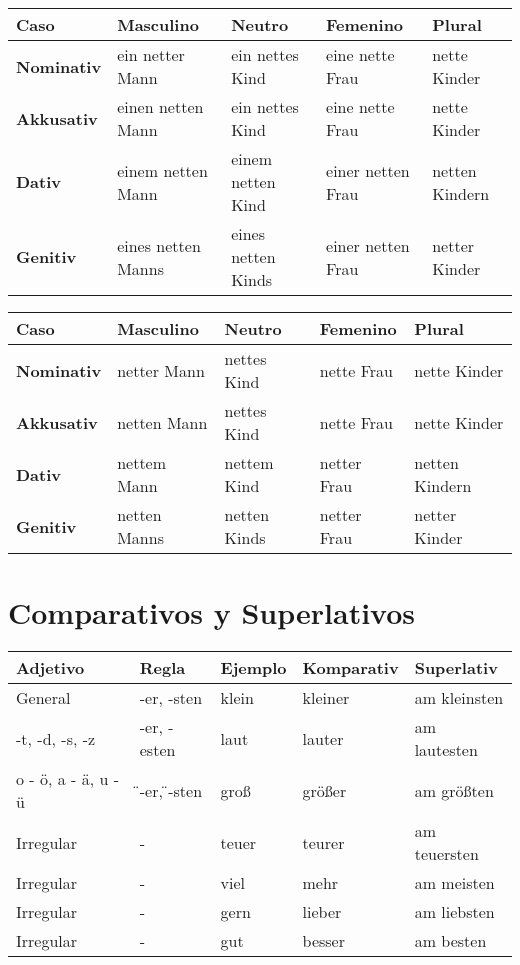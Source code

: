 \begin{tabular}{| l | l | l | l | l |}
\hline
\textbf{Caso} & \textbf{Masculino} & \textbf{Neutro} & \textbf{Femenino} & \textbf{Plural} \\
\hline
\textbf{Nominativ} & ein netter Mann & ein nettes Kind & eine nette Frau &  nette Kinder \\
\textbf{Akkusativ} & einen netten Mann & ein nettes Kind & eine nette Frau & nette Kinder \\
\textbf{Dativ} & einem netten Mann & einem netten Kind & einer netten Frau & netten Kindern \\
\textbf{Genitiv} & eines netten Manns & eines netten Kinds & einer netten Frau & netter Kinder \\
\hline
\end{tabular}



\begin{tabular}{| l | l | l | l | l |}
\hline
\textbf{Caso} & \textbf{Masculino} & \textbf{Neutro} & \textbf{Femenino} & \textbf{Plural} \\
\hline
\textbf{Nominativ} & netter Mann & nettes Kind & nette Frau &  nette Kinder \\
\textbf{Akkusativ} & netten Mann & nettes Kind & nette Frau & nette Kinder \\
\textbf{Dativ} & nettem Mann & nettem Kind & netter Frau & netten Kindern \\
\textbf{Genitiv} & netten Manns & netten Kinds & netter Frau & netter Kinder \\
\hline
\end{tabular}

\section{Comparativos y Superlativos}
\begin{tabular}{| l | l | l | l | l |}
\hline
\textbf{Adjetivo} & \textbf{Regla} & \textbf{Ejemplo} & \textbf{Komparativ} & \textbf{Superlativ} \\
\hline
General & -er, -sten & klein & kleiner & am kleinsten \\
-t, -d, -s, -z & -er, -esten & laut & lauter & am lautesten \\
o - ö, a - ä, u - ü & \"{ }-er, \"{ }-sten & groß & größer & am größten \\
Irregular & - & teuer & teurer & am teuersten \\
Irregular & - & viel & mehr & am meisten \\
Irregular & - & gern & lieber & am liebsten \\
Irregular & - & gut & besser & am besten \\
\hline
\end{tabular}

